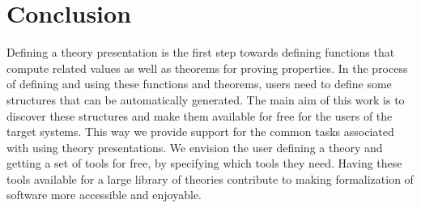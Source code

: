 \section{Conclusion}

Defining a theory presentation is the first step towards defining 
functions that compute related values 
as well as theorems for proving properties. 
In the process of defining and using these functions and theorems, users need to define some 
structures that can be automatically generated. The main aim of this work is to discover these 
structures and make them available for free for the users of the target systems. This way we 
provide support for the common tasks associated with using theory presentations. We envision the 
user defining a theory and getting a set of tools for free, by specifying 
which tools they need. Having these tools available for a large library of 
theories contribute to making formalization of software more accessible and enjoyable. 

